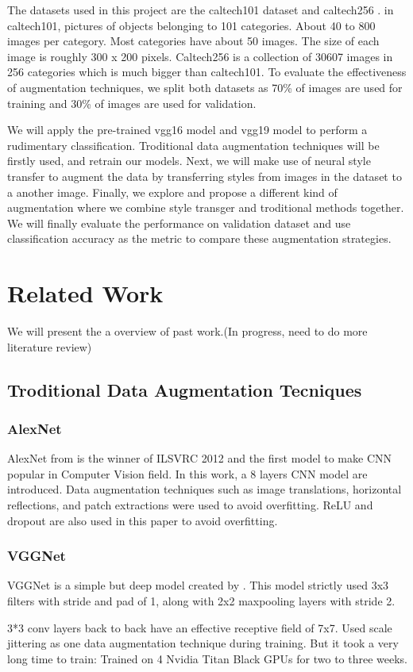 \documentclass[a4paper,11pt]{article}
\begin{document}
The datasets used in this project are the caltech101 dataset\cite{fei2006one} and caltech256 \cite{griffin2007caltech}. in caltech101, pictures of objects belonging to 101 categories. About 40 to 800 images per category. Most categories have about 50 images. The size of each image is roughly 300 x 200 pixels. Caltech256 is a collection of 30607 images in 256 categories which is much bigger than caltech101. To evaluate the effectiveness of augmentation techniques, we split both datasets as 70\% of images are used for training and 30\% of images are used for validation.

We will apply the pre-trained vgg16 model and vgg19 model to perform a rudimentary classification. Troditional data augmentation techniques will be firstly used, and retrain our models. Next, we will make use of neural style transfer to augment the data by transferring styles from images in the dataset to a another image. Finally, we explore and propose a different kind of augmentation where we combine style transger and troditional methods together. We will finally evaluate the performance on validation dataset and use classification accuracy as the metric to compare these augmentation strategies.

\section{Related Work}
We will present the a overview of past work.(In progress, need to do more literature review)
\subsection{Troditional Data Augmentation Tecniques}
\subsubsection{AlexNet}
AlexNet from \cite{krizhevsky2012imagenet} is the winner of ILSVRC 2012 and the first model to make CNN popular in Computer Vision field. In this work, a 8 layers CNN model are introduced. Data augmentation techniques such as image translations, horizontal reflections, and patch extractions were used to avoid overfitting. ReLU and dropout are also used in this paper to avoid overfitting.
\subsubsection{VGGNet}
VGGNet is a simple but deep model created by \cite{simonyan2014very}. This model strictly used 3x3 filters with stride and pad of 1, along with 2x2 maxpooling layers with stride 2.
\begin{outline}
 3*3 conv layers back to back have an effective receptive field of 7x7.
\1 Used scale jittering as one data augmentation technique during training.
\1 But it took a very long time to train: Trained on 4 Nvidia Titan Black GPUs for two to three weeks.
\end{outline}
\end{document}
